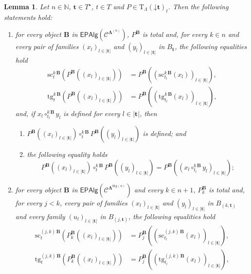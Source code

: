 \documentclass[a4paper, reqno]{amsbook}
\newcommand{\bb}[1]{\ensuremath{\lvert #1 \rvert}}
\newcommand{\vs}[1]{\mathbin{\downarrow}#1}
\newcommand{\sig}[1]{\mathbf{#1}}             %
\newcommand{\spec}[1]{\boldsymbol{\mathcal{#1}}} %
\newcommand{\htg}{\mathrm{htg}}                %
\newcommand{\src}{\mathrm{sc}}
\newcommand{\tgt}{\mathrm{tg}}
\theoremstyle{plain}
\newtheorem{lemma}[theorem]{Lemma}
\theoremstyle{definition}
\begin{document}
\begin{lemma}\label{LTermOpCatAlg}
Let $n\in\mathbb{N}$, $\mathbf{t}\in T^{\star}$, $t\in T$ and $P\in\mathrm{T}_{\Lambda}(\vs{\mathbf{t}})_{t}$.
Then the following statements hold:
\begin{enumerate}
\item for every object $\mathbf{B}$ in $\mathsf{EPAlg}(\spec{C}^{\sig{\Lambda}^{(n)}})$, $P^{\mathbf{B}}$ is total and, for every $k\in n$ and every pair of families $(x_{l})_{l\in\bb{\mathbf{t}}}$ and $(y_{l})_{l\in\bb{\mathbf{t}}}$ in $B_{\mathbf{t}}$, the following equalities hold
\begin{align*}
\src^{k\,\mathbf{B}}_{t}\left(P^{\mathbf{B}}\left((x_{l})_{l\in\bb{\mathbf{t}}}\right)\right)&=P^{\mathbf{B}}\left(\left(\src^{k\,\mathbf{B}}_{t_{l}}(x_{l})\right)_{l\in\bb{\mathbf{t}}}\right),
\\
\tgt^{k\,\mathbf{B}}_{t}\left(P^{\mathbf{B}}\left((x_{l})_{l\in\bb{\mathbf{t}}}\right)\right)&=P^{\mathbf{B}}\left(\left(\tgt^{k\,\mathbf{B}}_{t_{l}}(x_{l})\right)_{l\in\bb{\mathbf{t}}}\right),
\end{align*}
and, if $x_{l}\circ^{k\,\mathbf{B}}_{t_{l}}y_{l}$ is defined for every $l\in\bb{\mathbf{t}}$, then
\begin{enumerate}
\item $P^{\mathbf{B}}((x_{l})_{l\in\bb{\mathbf{t}}})\circ^{k\,\mathbf{B}}_{t}P^{\mathbf{B}}((y_{l})_{l\in\bb{\mathbf{t}}})$ is defined; and
\item the following equality holds
$$
P^{\mathbf{B}}\left((x_{l})_{l\in\bb{\mathbf{t}}}\right)\circ^{k\,\mathbf{B}}_{t}P^{\mathbf{B}}\left((y_{l})_{l\in\bb{\mathbf{t}}}\right)=P^{\mathbf{B}}\left(\left(x_{l}\circ^{k\,\mathbf{B}}_{t_{l}}y_{l}\right)_{l\in\bb{\mathbf{t}}}\right);
$$
\end{enumerate}
\item for every object $\mathbf{B}$ in $\mathsf{EPAlg}(\spec{C}^{\sig{\Lambda}^{\htg(n)}})$ and every $k\in n+1$, $P_{k}^{\mathbf{B}}$ is total and, for every $j<k$, every pair of families $(x_{l})_{l\in\bb{\mathbf{t}}}$ and $(y_{l})_{l\in\bb{\mathbf{t}}}$ in $B_{(k,\mathbf{t})}$ and every family $(u_{l})_{l\in\bb{\mathbf{t}}}$ in $B_{(j,\mathbf{t})}$, the following equalities hold
\begin{align*}
\src^{(j,k)\,\mathbf{B}}_{t}\left(P_{k}^{\mathbf{B}}\left((x_{l})_{l\in\bb{\mathbf{t}}}\right)\right)&=P_{j}^{\mathbf{B}}\left(\left(\src^{(j,k)\,\mathbf{B}}_{t_{l}}(x_{l})\right)_{l\in\bb{\mathbf{t}}}\right),
\\
\tgt^{(j,k)\,\mathbf{B}}_{t}\left(P_{k}^{\mathbf{B}}\left((x_{l})_{l\in\bb{\mathbf{t}}}\right)\right)&=P_{j}^{\mathbf{B}}\left(\left(\tgt^{(j,k)\,\mathbf{B}}_{t_{l}}(x_{l})\right)_{l\in\bb{\mathbf{t}}}\right),

\end{align*}
\end{enumerate}
\end{lemma}
\end{document}
